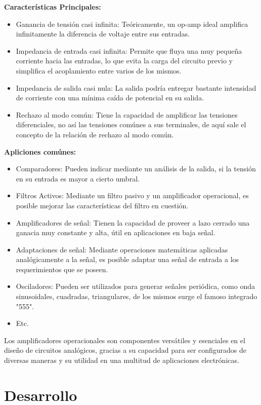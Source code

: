 \textbf{Características Principales:}
\begin{itemize}
    \item Ganancia de tensión casi infinita: Teóricamente, un op-amp ideal amplifica infinitamente la diferencia de voltaje entre sus entradas.
    \item Impedancia de entrada casi infinita: Permite que fluya una muy pequeña corriente hacia las entradas, lo que evita la carga del circuito previo y simplifica el acoplamiento entre varios de los mismos.
    \item Impedancia de salida casi nula: La salida podría entregar bastante intensidad de corriente con una mínima caída de potencial en su salida.
    \item Rechazo al modo común: Tiene la capacidad de amplificar las tensiones diferenciales, no así las tensiones comúnes a sus terminales, de aquí sale el concepto de la relación de rechazo al modo común.
\end{itemize}

\textbf{Apliciones comúnes:}
\begin{itemize}
    \item Comparadores: Pueden indicar mediante un análisis de la salida, si la tensión en su entrada es mayor a cierto umbral.
    \item Filtros Activos: Mediante un filtro pasivo y un amplificador operacional, es posible mejorar las características del filtro en cuestión.
    \item Amplificadores de señal: Tienen la capacidad de proveer a lazo cerrado una ganacia muy constante y alta, útil en aplicaciones en baja señal.
    \item Adaptaciones de señal: Mediante operaciones matemáticas aplicadas analógicamente a la señal, es posible adaptar una señal de entrada a los requerimientos que se poseen.
    \item Osciladores: Pueden ser utilizados para generar señales periódica, como onda sinusoidales, cuadradas, triangulares, de los mismos surge el famoso integrado "555".
    \item Etc.
\end{itemize}

Los amplificadores operacionales son componentes versátiles y esenciales en el diseño de circuitos analógicos, gracias a su capacidad para ser configurados de diversas maneras y su utilidad en una multitud de aplicaciones electrónicas.


\newpage
\section{Desarrollo}
